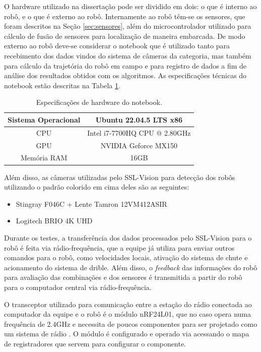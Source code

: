 \documentclass[acronym, symbols, table, deposito]{fei}
\begin{document}
		O hardware utilizado na dissertação pode ser dividido em dois: o que é interno ao robô, e o que é externo ao robô. Internamente ao robô têm-se os sensores, que foram descritos na Seção \ref{sec:sensores}, além do microcontrolador utilizado para cálculo de fusão de sensores para localização de maneira embarcada. De modo externo ao robô deve-se considerar o notebook que é utilizado tanto para recebimento dos dados vindos do sistema de câmeras da categoria, mas também para cálculo da trajetória do robô em campo e para registro de dados a fim de análise dos resultados obtidos com os algoritmos. As especificações técnicas do notebook estão descritas na Tabela \ref{tbl:especificacoes_notebook}.
		
		\begin{table}[!htb]
			\centering
			\caption{Especificações de hardware do notebook.}
			\label{tbl:especificacoes_notebook}
			\begin{tabular}{c c}
				\hline
				Sistema Operacional & Ubuntu 22.04.5 LTS x86\textunderscore64  \\ \hline
				CPU 				& Intel i7-7700HQ CPU @ 2.80GHz \\ \hline
				GPU 				& NVIDIA Geforce MX150 \\ \hline
				Memória RAM			& 16GB \\ \hline
			\end{tabular}
		\end{table}
	
		Além disso, as câmeras utilizadas pelo SSL-Vision para detecção dos robôs utilizando o padrão colorido em cima deles são as seguintes:
		
		\begin{itemize}
			\item Stingray F046C \cite{stingray_f046c} + Lente Tamron 12VM412ASIR
			\item Logitech BRIO 4K UHD \cite{logitech_brio}
		\end{itemize}
		
		Durante os testes, a transferência dos dados processados pelo SSL-Vision para o robô é feita via rádio-frequência, que a equipe já utiliza para enviar outros comandos para o robô, como velocidades locais, ativação do sistema de chute e acionamento do sistema de drible. Além disso, o \textit{feedback} das informações do robô para avaliação das combinações e dos sensores é transmitida a partir do robô para o computador central via rádio-frequência.
		
		O transceptor utilizado para comunicação entre a estação do rádio conectada ao computador da equipe e o robô é o módulo nRF24L01, que no caso opera numa frequência de 2.4GHz e necessita de poucos componentes para ser projetado como um sistema de rádio \cite{datasheet_nrf24}. O módulo é configurado e operado via  acessando o mapa de registradores que servem para configurar o componente.
		
\end{document}
